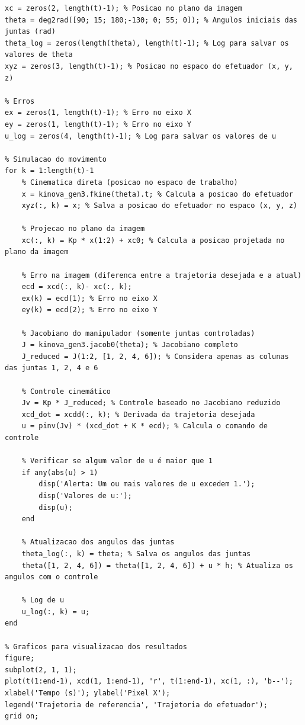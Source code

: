 \documentclass[10pt]{article}
\begin{document}
\begin{lstlisting}[caption={Código da segunda parte do trabalho}, label={code:subsecao22}]
% Inicializacao de variaveis
xc = zeros(2, length(t)-1); % Posicao no plano da imagem
theta = deg2rad([90; 15; 180;-130; 0; 55; 0]); % Angulos iniciais das juntas (rad)
theta_log = zeros(length(theta), length(t)-1); % Log para salvar os valores de theta
xyz = zeros(3, length(t)-1); % Posicao no espaco do efetuador (x, y, z)

% Erros
ex = zeros(1, length(t)-1); % Erro no eixo X
ey = zeros(1, length(t)-1); % Erro no eixo Y
u_log = zeros(4, length(t)-1); % Log para salvar os valores de u

% Simulacao do movimento
for k = 1:length(t)-1
    % Cinematica direta (posicao no espaco de trabalho)
    x = kinova_gen3.fkine(theta).t; % Calcula a posicao do efetuador
    xyz(:, k) = x; % Salva a posicao do efetuador no espaco (x, y, z)
    
    % Projecao no plano da imagem
    xc(:, k) = Kp * x(1:2) + xc0; % Calcula a posicao projetada no plano da imagem
    
    % Erro na imagem (diferenca entre a trajetoria desejada e a atual)
    ecd = xcd(:, k)- xc(:, k);
    ex(k) = ecd(1); % Erro no eixo X
    ey(k) = ecd(2); % Erro no eixo Y
    
    % Jacobiano do manipulador (somente juntas controladas)
    J = kinova_gen3.jacob0(theta); % Jacobiano completo
    J_reduced = J(1:2, [1, 2, 4, 6]); % Considera apenas as colunas das juntas 1, 2, 4 e 6
    
    % Controle cinemático
    Jv = Kp * J_reduced; % Controle baseado no Jacobiano reduzido
    xcd_dot = xcdd(:, k); % Derivada da trajetoria desejada
    u = pinv(Jv) * (xcd_dot + K * ecd); % Calcula o comando de controle
    
    % Verificar se algum valor de u é maior que 1
    if any(abs(u) > 1)
        disp('Alerta: Um ou mais valores de u excedem 1.');
        disp('Valores de u:');
        disp(u);
    end
    
    % Atualizacao dos angulos das juntas
    theta_log(:, k) = theta; % Salva os angulos das juntas
    theta([1, 2, 4, 6]) = theta([1, 2, 4, 6]) + u * h; % Atualiza os angulos com o controle
    
    % Log de u
    u_log(:, k) = u;
end

% Graficos para visualizacao dos resultados
figure;
subplot(2, 1, 1);
plot(t(1:end-1), xcd(1, 1:end-1), 'r', t(1:end-1), xc(1, :), 'b--');
xlabel('Tempo (s)'); ylabel('Pixel X');
legend('Trajetoria de referencia', 'Trajetoria do efetuador');
grid on;


\end{lstlisting}
\end{document}
